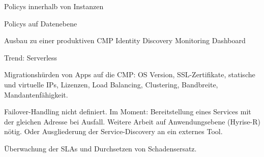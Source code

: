 Policys innerhalb von Instanzen 

Policys auf Datenebene

Ausbau zu einer produktiven CMP
Identity
Discovery
Monitoring
Dashboard

Trend: Serverless

Migrationshürden von Apps auf die CMP: OS Version, SSL-Zertifikate, statische und virtuelle IPs, Lizenzen, Load Balancing, Clustering, Bandbreite, Mandantenfähigkeit.

Failover-Handling nicht definiert. Im Moment: Bereitstellung eines Services mit der gleichen Adresse bei Ausfall. Weitere Arbeit auf Anwendungsebene (Hyrise-R) nötig. Oder Ausgliederung der Service-Discovery an ein externes Tool.

Überwachung der SLAs und Durchsetzen von Schadensersatz.